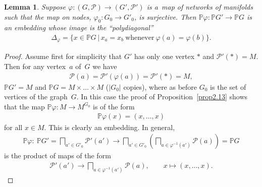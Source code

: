 \documentclass[10pt,a4paper]{amsart}
\numberwithin{equation}{section}
\newtheorem{Lemma}[Theorem]{Lemma}
\begin{document}
\begin{Lemma}
\label{lemma:2.surj}
Suppose $\varphi\colon (G,{\mathcal P})\to (G',{\mathcal P}')$ is a~map of networks of manifolds such that the map on
nodes, $\varphi_0\colon G_0 \to G'_0$, is surjective.
Then $\mathbb{P}\varphi\colon \mathbb{P} G'\to \mathbb{P} G$ is an embedding whose image is the ``polydiagonal''
\begin{gather*}
\Delta_\varphi = \{x\in \mathbb{P} G\,|\, x_a = x_b\ \text{whenever}\ \varphi(a) = \varphi(b)\}.
\end{gather*}
\end{Lemma}
\begin{proof}
Assume f\/irst for simplicity that $G'$ has only one vertex $*$ and ${\mathcal P}'(*) = M$.
Then for any vertex~$a$ of~$G$ we have
\begin{gather*}
{\mathcal P}(a) = {\mathcal P}' (\varphi(a)) = {\mathcal P}'(*) = M,
\end{gather*}
$\mathbb{P} G' = M$ and $\mathbb{P} G = M\times \dots \times M$ ($|G_0|$ copies), where as before $G_0$ is the set of vertices of the graph~$G$.
In this case the proof of Proposition~\ref{prop2.13} shows that the map $\mathbb{P}\varphi\colon M\to M^{G_0}$ is of the form
\begin{gather*}
\mathbb{P} \varphi (x) = (x,\ldots, x)
\end{gather*}
for all $x\in M$.
This is clearly an embedding.
In general,
\begin{gather*}
\mathbb{P} \varphi\colon \ \mathbb{P} G' =\bigsqcap_{a'\in G'_0} {\mathcal P}' (a') \to \bigsqcap_{a'\in G'_0}
\left(\bigsqcap_{a\in \varphi^{-1} (a')} {\mathcal P}(a)\right) = \mathbb{P} G
\end{gather*}
is the product of maps of the form
\begin{gather*}
{\mathcal P}' (a') \to \bigsqcap_{a\in \varphi^{-1} (a')} {\mathcal P}(a),
\qquad
x\mapsto (x,\ldots, x).\tag*{\qed}
\end{gather*}
\renewcommand{\qed}{}
\end{proof}
\end{document}
